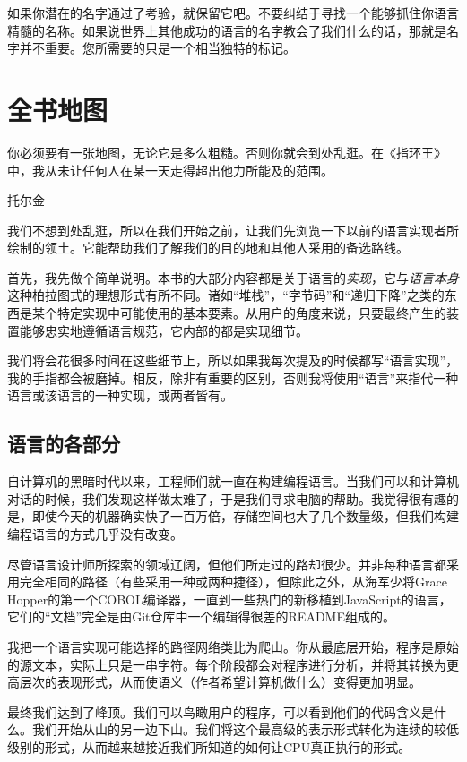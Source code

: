 \documentclass[cn,11pt,chinese]{elegantbook}
\begin{document}
如果你潜在的名字通过了考验，就保留它吧。不要纠结于寻找一个能够抓住你语言精髓的名称。如果说世界上其他成功的语言的名字教会了我们什么的话，那就是名字并不重要。您所需要的只是一个相当独特的标记。

\chapter{全书地图}

\epigraph{你必须要有一张地图，无论它是多么粗糙。否则你就会到处乱逛。在《指环王》中，我从未让任何人在某一天走得超出他力所能及的范围。}{托尔金}

我们不想到处乱逛，所以在我们开始之前，让我们先浏览一下以前的语言实现者所绘制的领土。它能帮助我们了解我们的目的地和其他人采用的备选路线。

首先，我先做个简单说明。本书的大部分内容都是关于语言的\textit{实现}，它与\textit{语言本身}这种柏拉图式的理想形式有所不同。诸如“堆栈”，“字节码”和“递归下降”之类的东西是某个特定实现中可能使用的基本要素。从用户的角度来说，只要最终产生的装置能够忠实地遵循语言规范，它内部的都是实现细节。

我们将会花很多时间在这些细节上，所以如果我每次提及的时候都写“语言实现”，我的手指都会被磨掉。相反，除非有重要的区别，否则我将使用“语言”来指代一种语言或该语言的一种实现，或两者皆有。

\section{语言的各部分}

自计算机的黑暗时代以来，工程师们就一直在构建编程语言。当我们可以和计算机对话的时候，我们发现这样做太难了，于是我们寻求电脑的帮助。我觉得很有趣的是，即使今天的机器确实快了一百万倍，存储空间也大了几个数量级，但我们构建编程语言的方式几乎没有改变。

尽管语言设计师所探索的领域辽阔，但他们所走过的路却很少。并非每种语言都采用完全相同的路径（有些采用一种或两种捷径），但除此之外，从海军少将Grace Hopper的第一个COBOL编译器，一直到一些热门的新移植到JavaScript的语言，它们的“文档”完全是由Git仓库中一个编辑得很差的README组成的。

我把一个语言实现可能选择的路径网络类比为爬山。你从最底层开始，程序是原始的源文本，实际上只是一串字符。每个阶段都会对程序进行分析，并将其转换为更高层次的表现形式，从而使语义（作者希望计算机做什么）变得更加明显。

最终我们达到了峰顶。我们可以鸟瞰用户的程序，可以看到他们的代码含义是什么。我们开始从山的另一边下山。我们将这个最高级的表示形式转化为连续的较低级别的形式，从而越来越接近我们所知道的如何让CPU真正执行的形式。
\end{document}
